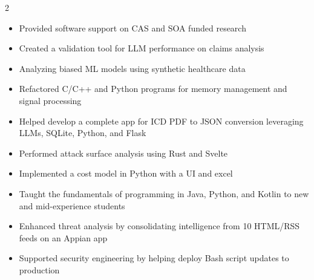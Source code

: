 \documentclass[10pt,a4paper,withhyper]{altacv}
\begin{document}


\makecvheader


\begin{paracol}{2}

\begin{itemize}
\item Provided software support on CAS and SOA funded research
\item Created a validation tool for LLM performance on claims analysis
\item Analyzing biased ML models using synthetic healthcare data
\end{itemize}

\divider

\begin{itemize}
\item Refactored C/C++ and Python programs for memory management and signal processing
\item Helped develop a complete app for ICD PDF to JSON conversion leveraging LLMs, SQLite, Python, and Flask
\item Performed attack surface analysis using Rust and Svelte
\item Implemented a cost model in Python with a UI and excel
\end{itemize}

\divider

\begin{itemize}
\item Taught the fundamentals of programming in Java, Python, and Kotlin to new and mid-experience students
\end{itemize}

\divider

\begin{itemize}
\item Enhanced threat analysis by consolidating intelligence from 10 HTML/RSS feeds on an Appian app
\item Supported security engineering by helping deploy Bash script updates to production
\end{itemize}


\end{paracol}
\end{document}
